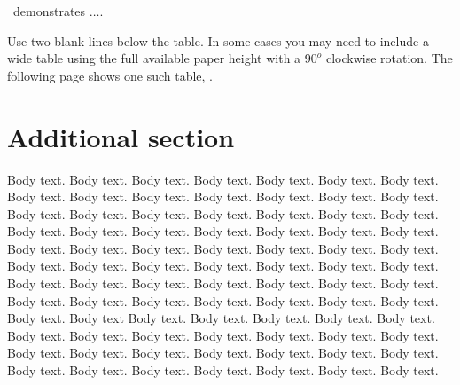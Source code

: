 ~demonstrates $\ldots$.

			
						
					


Use two blank lines below the table. In some cases you may need to include a wide table using the full available paper height with a $90^{o}$ clockwise rotation. 
The following page shows one such table, .


\begin{landscape}
\end{landscape}


\section{Additional section}

Body text. Body text. Body text. Body text. Body text. Body text. Body text. Body text. Body text. Body text. Body text. Body text. Body text. Body text. Body text. Body text. Body text. Body text. Body text. Body text. Body text. Body text. Body text. Body text. Body text. Body text. Body text. Body text. Body text. Body text. Body text. Body text. Body text. Body text. Body text. Body text. Body text. Body text. Body text. Body text. Body text. Body text. Body text. Body text. Body text. Body text. Body text. Body text. Body text. Body text. Body text. Body text. Body text. Body text. Body text. Body text. Body text. Body text
Body text. Body text. Body text. Body text. Body text. Body text. Body text. Body text. Body text. Body text. Body text. Body text. Body text. Body text. Body text. Body text. Body text. Body text. Body text. Body text. Body text. Body text. Body text. Body text. Body text. Body text.

